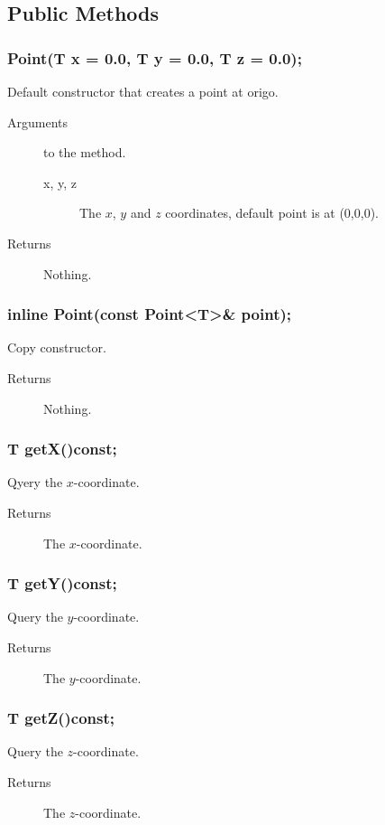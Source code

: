 \subsection{Public Methods}

\subsubsection{Point(T x = 0.0, T y = 0.0, T z = 0.0);}
Default constructor that creates a point at origo.
\begin{description}
  \item[Arguments] to the method.
    \begin{description}
      \item[x, y, z] The $x$, $y$ and $z$ coordinates, 
                     default point is at (0,0,0).
    \end{description}
  \item[Returns] Nothing.
\end{description}

\subsubsection{inline Point(const Point<T>\& point);}
Copy constructor. 
\begin{description}
  \item[Returns] Nothing.
\end{description}

\subsubsection{T getX()const;}
Qyery the $x$-coordinate.
\begin{description}
  \item[Returns] The $x$-coordinate.
\end{description}

\subsubsection{T getY()const;}
Query the $y$-coordinate. 
\begin{description}
  \item[Returns] The $y$-coordinate.
\end{description}

\subsubsection{T getZ()const;}
Query the $z$-coordinate.
\begin{description}
  \item[Returns] The $z$-coordinate.
\end{description}

